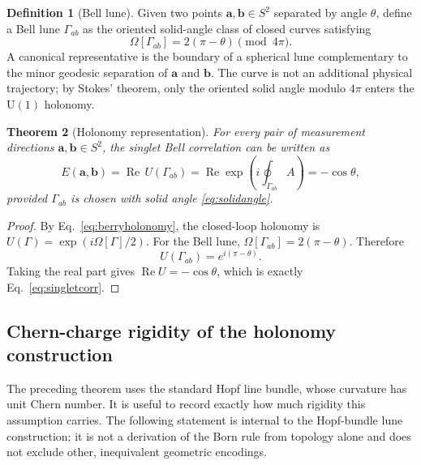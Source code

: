 \documentclass[
  aps,
  pra,
  reprint,
  superscriptaddress,
  nofootinbib,
  longbibliography,
  floatfix,
  amsmath,
  amssymb
]{revtex4-2}
\theoremstyle{plain}
\newtheorem{theorem}{Theorem}
\theoremstyle{definition}
\newtheorem{definition}[theorem]{Definition}
\theoremstyle{remark}
\newcommand{\UU}{\mathrm{U}}
\begin{document}
\begin{definition}[Bell lune]
Given two points \(\bm a,\bm b\in S^2\) separated by angle \(\theta\), define a Bell lune \(\Gamma_{ab}\) as the oriented solid-angle class of closed curves satisfying
\begin{equation}
\Omega[\Gamma_{ab}]=2(\pi-\theta)\pmod{4\pi}.
\end{equation}
A canonical representative is the boundary of a spherical lune complementary to the minor geodesic separation of \(\bm a\) and \(\bm b\).  The curve is not an additional physical trajectory; by Stokes' theorem, only the oriented solid angle modulo \(4\pi\) enters the \(\UU(1)\) holonomy.
\end{definition}

\begin{theorem}[Holonomy representation]
For every pair of measurement directions \(\bm a,\bm b\in S^2\), the singlet Bell correlation can be written as
\begin{equation}
E(\bm a,\bm b)=\operatorname{Re}\,U(\Gamma_{ab})
=\operatorname{Re}\exp\left(i\oint_{\Gamma_{ab}}A\right)
=-\cos\theta,
\label{eq:holonomycorrelation}
\end{equation}
provided \(\Gamma_{ab}\) is chosen with solid angle \eqref{eq:solidangle}.
\end{theorem}

\begin{proof}
By Eq.~\eqref{eq:berryholonomy}, the closed-loop holonomy is \(U(\Gamma)=\exp(i\Omega[\Gamma]/2)\).  For the Bell lune, \(\Omega[\Gamma_{ab}]=2(\pi-\theta)\).  Therefore
\begin{equation}
U(\Gamma_{ab})=e^{i(\pi-\theta)}.
\end{equation}
Taking the real part gives \(\operatorname{Re}U=-\cos\theta\), which is exactly Eq.~\eqref{eq:singletcorr}.
\end{proof}


\subsection{Chern-charge rigidity of the holonomy construction}
\label{subsec:chernrigidity}

The preceding theorem uses the standard Hopf line bundle, whose curvature has unit Chern number.  It is useful to record exactly how much rigidity this assumption carries.  The following statement is internal to the Hopf-bundle lune construction; it is not a derivation of the Born rule from topology alone and does not exclude other, inequivalent geometric encodings.
\end{document}
